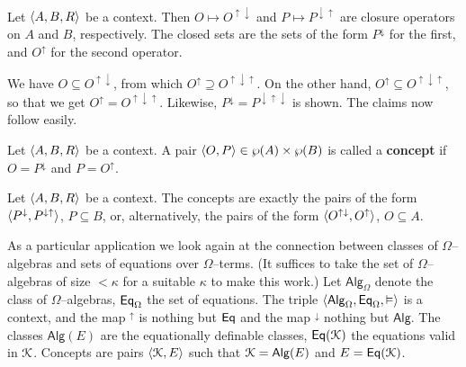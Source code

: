 \begin{prop}
\label{prop:closure} Let $\langle A, B, R\rangle$ be a context. Then $O
\mapsto O^{\uparrow\downarrow}$ and $P \mapsto P^{\downarrow\uparrow}$ 
are closure operators on $A$ and $B$, respectively. The closed sets 
are the sets of the form $P^{\downarrow}$ for the first, and 
$O^{\uparrow}$ for the second operator.
\end{prop}
\proofbeg
We have $O \subseteq O^{\uparrow\downarrow}$, from which
$O^{\uparrow} \supseteq O^{\uparrow\downarrow\uparrow}$. On
the other hand, $O^{\uparrow} \subseteq O^{\uparrow\downarrow\uparrow}$,
so that we get $O^{\uparrow} = O^{\uparrow\downarrow\uparrow}$.
Likewise, $P^{\downarrow} = P^{\downarrow\uparrow\downarrow}$ is
shown. The claims now follow easily.
\proofend
\begin{defn}
Let $\langle A, B, R\rangle$ be a context. A pair $\langle O, P\rangle
\in \wp(A) \times \wp(B)$ is called a \textbf{concept} if
$O = P^{\downarrow}$ and $P = O^{\uparrow}$.
\end{defn}
\begin{thm}
Let $\langle A, B, R\rangle$ be a context. The concepts are exactly the
pairs of the form $\langle P^{\downarrow}, P^{\downarrow\uparrow}\rangle$,
$P \subseteq B$, or, alternatively, the pairs of the form
$\langle O^{\uparrow\downarrow}, O^{\uparrow}\rangle$, $O \subseteq A$.
\end{thm}
As a particular application we look again at the connection
between classes of $\Omega$--algebras and sets of equations
over $\Omega$--terms. (It suffices to take the set of
$\Omega$--algebras of size $< \kappa$ for a suitable $\kappa$
to make this work.) Let $\mathsf{Alg}_{\Omega}$ denote the
class of $\Omega$--algebras, $\mbox{\sf Eq}_{\Omega}$ the
set of equations. The triple $\langle \mathsf{Alg}_{\Omega},
\mbox{\sf Eq}_{\Omega}, \vDash\rangle$ is a context, and the
map $^{\uparrow}$ is nothing but $\mbox{\sf Eq}$ and the map
$^{\downarrow}$ nothing but $\mathsf{Alg}$. The classes
$\mathsf{Alg}(E)$ are the equationally definable classes,
$\mathsf{Eq}(\mathcal{K})$ the equations valid in $\mathcal{K}$. Concepts
are pairs $\langle \mathcal{K}, E\rangle$ such that $\mathcal{K} = \mathsf{Alg}(E)$
and $E = \mathsf{Eq}(\mathcal{K})$.

